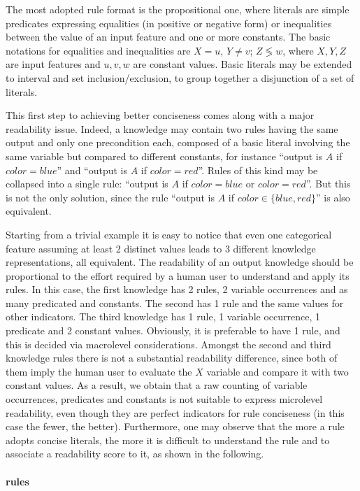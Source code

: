 \documentclass[sigconf]{acmart}
\begin{document}
The most adopted rule format is the propositional one, where literals are simple predicates expressing equalities (in positive or negative form) or inequalities between the value of an input feature and one or more constants.
%
The basic notations for equalities and inequalities are $X = u$, $Y \neq v$; $Z \lessgtr w$, where $X,Y,Z$ are input features and $u,v,w$ are constant values.
%
Basic literals may be extended to interval and set inclusion/exclusion, to group together a disjunction of a set of literals.

This first step to achieving better conciseness comes along with a major readability issue.
%
Indeed, a knowledge may contain two rules having the same output and only one precondition each, composed of a basic literal involving the same variable but compared to different constants, for instance ``output is $A$ if $color=blue$'' and ``output is $A$ if $color=red$''.
%
Rules of this kind may be collapsed into a single rule: ``output is $A$ if $color=blue$ or $color=red$''.
%
But this is not the only solution, since the rule ``output is $A$ if $color \in \{blue,red\}$'' is also equivalent.

Starting from a trivial example it is easy to notice that even one categorical feature assuming at least 2 distinct values leads to 3 different knowledge representations, all equivalent.
%
The readability of an output knowledge should be proportional to the effort required by a human user to understand and apply its rules.
%
In this case, the first knowledge has 2 rules, 2 variable occurrences and as many predicated and constants.
%
The second has 1 rule and the same values for other indicators.
%
The third knowledge has 1 rule, 1 variable occurrence, 1 predicate and 2 constant values.
%
Obviously, it is preferable to have 1 rule, and this is decided via macrolevel considerations.
%
Amongst the second and third knowledge rules there is not a substantial readability difference, since both of them imply the human user to evaluate the $X$ variable and compare it with two constant values.
%
As a result, we obtain that a raw counting of variable occurrences, predicates and constants is not suitable to express microlevel readability, even though they are perfect indicators for rule conciseness (in this case the fewer, the better).
%
Furthermore, one may observe that the more a rule adopts concise literals, the more it is difficult to understand the rule and to associate a readability score to it, as shown in the following.

\paragraph{\mofn{} rules}
\end{document}
